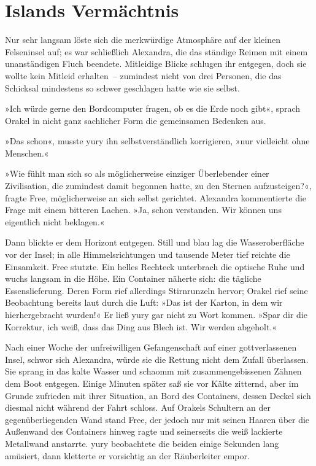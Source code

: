 \chapter{Islands Vermächtnis}

Nur sehr langsam löste sich die merkwürdige Atmosphäre auf der kleinen Felseninsel auf; es war schließlich Alexandra, die das ständige Reimen mit einem unanständigen Fluch beendete. Mitleidige Blicke schlugen ihr entgegen, doch sie wollte kein Mitleid erhalten~– zumindest nicht von drei Personen, die das Schicksal mindestens so schwer geschlagen hatte wie sie selbst.

»Ich würde gerne den Bordcomputer fragen, ob es die Erde noch gibt«, sprach Orakel in nicht ganz sachlicher Form die gemeinsamen Bedenken aus.

»Das schon«, musste yury ihn selbstverständlich korrigieren, »nur vielleicht ohne Menschen.«

»Wie fühlt man sich so als möglicherweise einziger Überlebender einer Zivilisation, die zumindest damit begonnen hatte, zu den Sternen aufzusteigen?«, fragte Free, möglicherweise an sich selbst gerichtet. Alexandra kommentierte die Frage mit einem bitteren Lachen. »Ja, schon verstanden. Wir können uns eigentlich nicht beklagen.«

Dann blickte er dem Horizont entgegen. Still und blau lag die Wasseroberfläche vor der Insel; in alle Himmelsrichtungen und tausende Meter tief reichte die Einsamkeit. Free stutzte. Ein helles Rechteck unterbrach die optische Ruhe und wuchs langsam in die Höhe. Ein Container näherte sich: die tägliche Essenslieferung. Deren Form rief allerdings Stirnrunzeln hervor; Orakel rief seine Beobachtung bereits laut durch die Luft: »Das ist der Karton, in dem wir hierhergebracht wurden!« Er ließ yury gar nicht zu Wort kommen. »Spar dir die Korrektur, ich weiß, dass das Ding aus Blech ist. Wir werden abgeholt.«

Nach einer Woche der unfreiwilligen Gefangenschaft auf einer gottverlassenen Insel, schwor sich Alexandra, würde sie die Rettung nicht dem Zufall überlassen. Sie sprang in das kalte Wasser und schaomm mit zusammengebissenen Zähnen dem Boot entgegen. Einige Minuten später saß sie vor Kälte zitternd, aber im Grunde zufrieden mit ihrer Situation, an Bord des Containers, dessen Deckel sich diesmal nicht während der Fahrt schloss. Auf Orakels Schultern an der gegenüberliegenden Wand stand Free, der jedoch nur mit seinen Haaren über die Außenwand des Containers hinweg ragte und seinerseits die weiß lackierte Metallwand anstarrte. yury beobachtete die beiden einige Sekunden lang amüsiert, dann kletterte er vorsichtig an der Räuberleiter empor.

